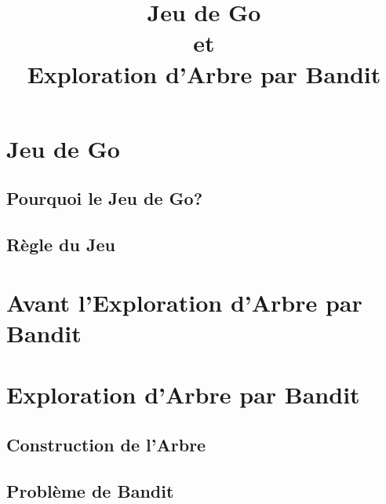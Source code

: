 \documentclass[compress, color = usenames, dvipsnames]{beamer}
\title[Jeu de Go \\ et \\ Exploration d'Arbre par Bandit]{Jeu de Go \\ et \\ Exploration d'Arbre par Bandit}
\subtitle[]{}
\date[]{}
\institute[]{\large CentraleSupélec -- Gif}
\begin{document}
\frame{
  \titlepage
}




\section{Jeu de Go}

\subsection{Pourquoi le Jeu de Go?}




\subsection{Règle du Jeu}



\section{Avant l'Exploration d'Arbre par Bandit}


\section{Exploration d'Arbre par Bandit}

\subsection{Construction de l'Arbre}


\subsection{Problème de Bandit}
\end{document}
